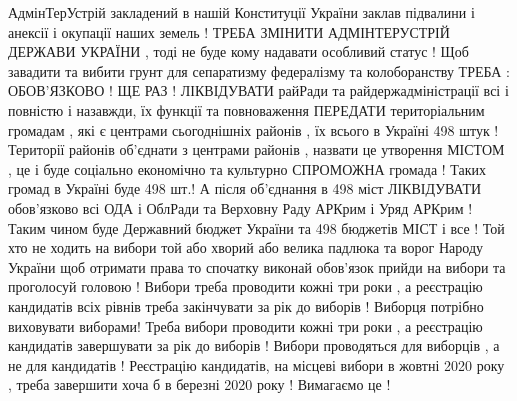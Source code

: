 АдмінТерУстрій закладений в нашій Конституції України заклав підвалини і анексії і окупації наших земель !
ТРЕБА ЗМІНИТИ АДМІНТЕРУСТРІЙ ДЕРЖАВИ УКРАЇНИ , тоді не буде кому надавати особливий статус !
Щоб завадити та вибити грунт для сепаратизму федералізму та колоборанству ТРЕБА :
ОБОВ'ЯЗКОВО ! ЩЕ РАЗ !
ЛІКВІДУВАТИ райРади та райдержадміністрації всі і повністю і назавжди, їх функції та повноваження ПЕРЕДАТИ територіальним громадам , які є центрами сьогоднішніх районів , їх всього в Україні 498 штук !
Території районів об'єднати з центрами районів , назвати це утворення МІСТОМ , це і буде соціально економічно та культурно СПРОМОЖНА громада !
Таких громад в Україні буде 498 шт.!
А після об'єднання в 498 міст ЛІКВІДУВАТИ обов'язково всі ОДА і ОблРади та Верховну Раду АРКрим і Уряд АРКрим !
Таким чином буде Державний бюджет України та 498 бюджетів МІСТ і все !
Той хто не ходить на вибори той або хворий або велика падлюка та ворог Народу України щоб отримати права то спочатку виконай обов'язок прийди на вибори та проголосуй головою !
Вибори треба проводити кожні три роки , а реєстрацію кандидатів всіх рівнів треба закінчувати за рік до виборів !
Виборця потрібно виховувати виборами!
Треба вибори проводити кожні три роки , а реєстрацію кандидатів завершувати за рік до виборів !
Вибори проводяться для виборців , а не для кандидатів !
Реєстрацію кандидатів, на місцеві вибори в жовтні 2020 року , треба завершити хоча б в березні 2020 року ! Вимагаємо це !

